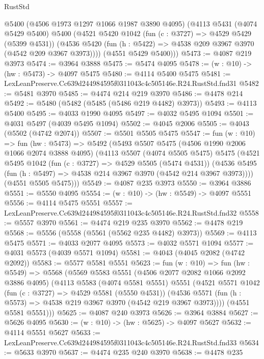 \begin{lexlean}{RustStd}
\begin{coremodule}
      @5400
      (@4506 @1973 @1297 @1066 @1987 @3890 @4095)
      (@4113
        @5431
        (@4074 @5429 @5400)
        @5400
        (@4521
          @5420
          @1042
          (fun (c : @3727) => @4529 @5429 (@5399 @4531))
          (@4536 @5420 (fun (h : @5422) => @4538 @209 @3967 @3970 (@4542 @209 @3967 @3973))))
        (@4551 @5429 @5400)))
@5473 := @4087 @219 @3973
@5474 := @3964 @3888
@5475 := @5474 @4095
@5478 := (w : @10) -> (hw : @5473) -> @4097 @5475
@5480 := @4114 @5400 @5475
@5481 := LexLeanPreserve.Cc639d244984595f0311043c4c505146e.R24.RustStd.fnd31
@5482 := @5481 @3970
@5485 := @4474 @214 @219 @3970
@5486 := @4478 @214
@5492 := @5480 (@5482 (@5485 (@5486 @219 @4482) @3973))
@5493 := @4113 @5400
@5495 := @4033 @1990 @4095
@5497 := @4032 @5495 @1094
@5501 := @4031 @5497 (@4039 @5495 @1094)
@5502 := @4045 @2006
@5505 := @4043 (@5502 (@4742 @2074))
@5507 := @5501 @5505 @5475
@5547 := fun (w : @10) =>
  fun (hw : @5473) =>
  @5492
    (@5493
      @5507
      @5475
      (@4506 @1990 @2006 @1066 @2074 @3888 @4095)
      (@4113
        @5507
        (@4074 @5505 @5475)
        @5475
        (@4521
          @5495
          @1042
          (fun (c : @3727) => @4529 @5505 (@5474 @4531))
          (@4536 @5495 (fun (h : @5497) => @4538 @214 @3967 @3970 (@4542 @214 @3967 @3973))))
        (@4551 @5505 @5475)))
@5549 := @4087 @235 @3973
@5550 := @3964 @3886
@5551 := @5550 @4095
@5554 := (w : @10) -> (hw : @5549) -> @4097 @5551
@5556 := @4114 @5475 @5551
@5557 := LexLeanPreserve.Cc639d244984595f0311043c4c505146e.R24.RustStd.fnd32
@5558 := @5557 @3970
@5561 := @4474 @219 @235 @3970
@5562 := @4478 @219
@5568 := @5556 (@5558 (@5561 (@5562 @235 @4482) @3973))
@5569 := @4113 @5475
@5571 := @4033 @2077 @4095
@5573 := @4032 @5571 @1094
@5577 := @4031 @5573 (@4039 @5571 @1094)
@5581 := @4043 (@4045 @2082 (@4742 @2092))
@5583 := @5577 @5581 @5551
@5623 := fun (w : @10) =>
  fun (hw : @5549) =>
  @5568
    (@5569
      @5583
      @5551
      (@4506 @2077 @2082 @1066 @2092 @3886 @4095)
      (@4113
        @5583
        (@4074 @5581 @5551)
        @5551
        (@4521
          @5571
          @1042
          (fun (c : @3727) => @4529 @5581 (@5550 @4531))
          (@4536 @5571 (fun (h : @5573) => @4538 @219 @3967 @3970 (@4542 @219 @3967 @3973))))
        (@4551 @5581 @5551)))
@5625 := @4087 @240 @3973
@5626 := @3964 @3884
@5627 := @5626 @4095
@5630 := (w : @10) -> (hw : @5625) -> @4097 @5627
@5632 := @4114 @5551 @5627
@5633 := LexLeanPreserve.Cc639d244984595f0311043c4c505146e.R24.RustStd.fnd33
@5634 := @5633 @3970
@5637 := @4474 @235 @240 @3970
@5638 := @4478 @235

\end{coremodule}
\end{lexlean}
